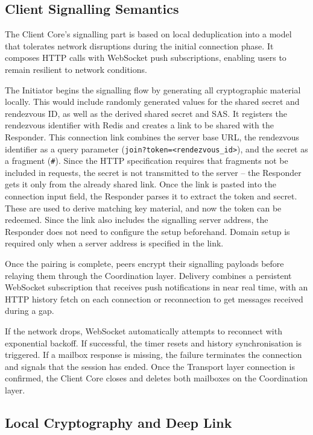 \documentclass[12pt,a4paper,oneside]{report}
\begin{document}
\subsection{Client Signalling Semantics}
\label{sec:client-signalling}

The Client Core's signalling part is based on local deduplication into a model that tolerates network disruptions during the initial connection phase. It composes HTTP calls with WebSocket push subscriptions, enabling users to remain resilient to network conditions.

The Initiator begins the signalling flow by generating all cryptographic material locally. This would include randomly generated values for the shared secret and rendezvous ID, as well as the derived shared secret and SAS. It registers the rendezvous identifier with Redis and creates a link to be shared with the Responder. This connection link combines the server base URL, the rendezvous identifier as a query parameter (\texttt{join?token=<rendezvous\_id>}), and the secret as a fragment (\texttt{\#}). Since the HTTP specification requires that fragments not be included in requests, the secret is not transmitted to the server -- the Responder gets it only from the already shared link. Once the link is pasted into the connection input field, the Responder parses it to extract the token and secret. These are used to derive matching key material, and now the token can be redeemed. Since the link also includes the signalling server address, the Responder does not need to configure the setup beforehand. Domain setup is required only when a server address is specified in the link.

Once the pairing is complete, peers encrypt their signalling payloads before relaying them through the Coordination layer. Delivery combines a persistent WebSocket subscription that receives push notifications in near real time, with an HTTP history fetch on each connection or reconnection to get messages received during a gap.

If the network drops, WebSocket automatically attempts to reconnect with exponential backoff. If successful, the timer resets and history synchronisation is triggered. If a mailbox response is missing, the failure terminates the connection and signals that the session has ended. Once the Transport layer connection is confirmed, the Client Core closes and deletes both mailboxes on the Coordination layer.


\subsection{Local Cryptography and Deep Link}
\label{sec:local-crypto}
\end{document}
